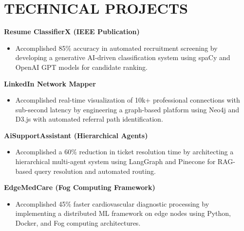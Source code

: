 \documentclass[a4paper,10pt]{article}
\begin{document}
\section{TECHNICAL PROJECTS}

\noindent
\textbf{Resume ClassifierX (IEEE Publication)}
\begin{itemize}
    \item Accomplished 85\% accuracy in automated recruitment screening by developing a generative AI-driven classification system using spaCy and OpenAI GPT models for candidate ranking.
\end{itemize}

\vspace{4pt}
\noindent
\textbf{LinkedIn Network Mapper}
\begin{itemize}
    \item Accomplished real-time visualization of 10k+ professional connections with sub-second latency by engineering a graph-based platform using Neo4j and D3.js with automated referral path identification.
\end{itemize}

\vspace{4pt}
\noindent
\textbf{AiSupportAssistant (Hierarchical Agents)}
\begin{itemize}
    \item Accomplished a 60\% reduction in ticket resolution time by architecting a hierarchical multi-agent system using LangGraph and Pinecone for RAG-based query resolution and automated routing.
\end{itemize}

\vspace{4pt}
\noindent
\textbf{EdgeMedCare (Fog Computing Framework)}
\begin{itemize}
    \item Accomplished 45\% faster cardiovascular diagnostic processing by implementing a distributed ML framework on edge nodes using Python, Docker, and Fog computing architectures.
\end{itemize}
\end{document}
